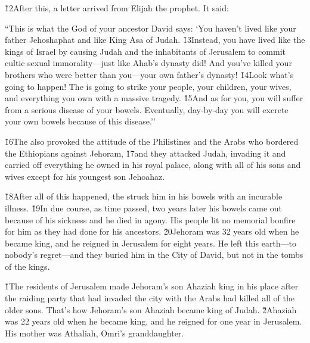 \v{12}After this, a letter arrived from Elijah the prophet. It said:

\begin{poetry}
\poeml ``This is what the  God of your ancestor David says: `You haven't lived like your father Jehoshaphat and like King Asa of Judah. \v{13}Instead, you have lived like the kings of Israel by causing Judah and the inhabitants of Jerusalem to commit cultic sexual immorality---just like Ahab's dynasty did! And you've killed your brothers who were better than you---your own father's dynasty! \v{14}Look what's going to happen! The  is going to strike your people, your children, your wives, and everything you own with a massive tragedy. \v{15}And as for you, you will suffer from a serious disease of your bowels. Eventually, day-by-day you will excrete your own bowels because of this disease.''
\end{poetry}

\v{16}The  also provoked the attitude of the Philistines and the Arabs who bordered the Ethiopians against Jehoram, \v{17}and they attacked Judah, invading it and carried off everything he owned in his royal palace, along with all of his sons and wives except for his youngest son Jehoahaz.

\v{18}After all of this happened, the  struck him in his bowels with an incurable illness. \v{19}In due course, as time passed, two years later his bowels came out because of his sickness and he died in agony. His people lit no memorial bonfire for him as they had done for his ancestors. \v{20}Jehoram was 32 years old when he became king, and he reigned in Jerusalem for eight years. He left this earth---to nobody's regret---and they buried him in the City of David, but not in the tombs of the kings.

\v{1}The residents of Jerusalem made Jehoram's son Ahaziah king in his place after the raiding party that had invaded the city with the Arabs had killed all of the older sons. That's how Jehoram's son Ahaziah became king of Judah. \v{2}Ahaziah was 22 years old when he became king, and he reigned for one year in Jerusalem. His mother was Athaliah, Omri's granddaughter.

